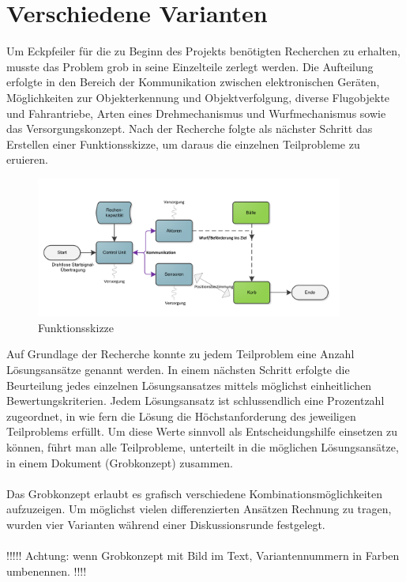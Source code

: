 \section{Verschiedene Varianten}
Um Eckpfeiler für die zu Beginn des Projekts benötigten Recherchen zu erhalten, musste das Problem grob in seine Einzelteile zerlegt werden. Die Aufteilung erfolgte in den Bereich der Kommunikation zwischen elektronischen Geräten, Möglichkeiten zur Objekterkennung und Objektverfolgung, diverse Flugobjekte und Fahrantriebe, Arten eines Drehmechanismus und Wurfmechanismus sowie das Versorgungskonzept. 
Nach der Recherche folgte als nächster Schritt das Erstellen einer Funktionsskizze, um daraus die einzelnen Teilprobleme zu eruieren.
\begin{figure}[h!]
	\centering
	\includegraphics[width=0.9\textwidth]{Enddokumentation/Varianten/Bilder/Funktionsskizze.png}
	\caption{Funktionsskizze}
	\label{fig:Funktionsskizze}
\end{figure}
Auf Grundlage der Recherche konnte zu jedem Teilproblem eine Anzahl Lösungsansätze genannt werden. In einem nächsten Schritt erfolgte die Beurteilung jedes einzelnen Lösungsansatzes mittels möglichst einheitlichen Bewertungskriterien. Jedem Lösungsansatz ist schlussendlich eine Prozentzahl zugeordnet, in wie fern die Lösung die Höchstanforderung des jeweiligen Teilproblems erfüllt. Um diese Werte sinnvoll als Entscheidungshilfe einsetzen zu können, führt man alle Teilprobleme, unterteilt in die möglichen Lösungsansätze, in einem Dokument (Grobkonzept) zusammen. \\
\\
Das Grobkonzept erlaubt es grafisch verschiedene Kombinationsmöglichkeiten aufzuzeigen. Um möglichst vielen differenzierten Ansätzen Rechnung zu tragen, wurden vier Varianten während einer Diskussionsrunde festgelegt.\\\\ 
!!!!! Achtung: wenn Grobkonzept mit Bild im Text, Variantennummern in Farben umbenennen. !!!!\\\\
